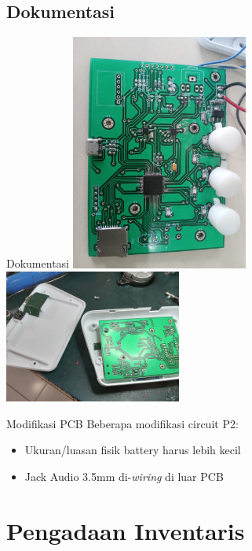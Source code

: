 \documentclass[table,dvipsnames]{beamer}
\begin{document}
	\begin{frame}
		\subsection{Dokumentasi}
		\begin{exampleblock}{Dokumentasi}
			\includegraphics[width=165pt]{images/pack_open0}
			\includegraphics[width=165pt]{images/pack_open1}
		\end{exampleblock}
	
		\begin{exampleblock}{Modifikasi PCB}
			Beberapa modifikasi circuit P2:
			\begin{itemize}
				\item Ukuran/luasan fisik battery harus lebih kecil
				\item Jack Audio 3.5mm di-\textit{wiring} di luar PCB
			\end{itemize}
		\end{exampleblock}
	\end{frame}
	
	\section{Pengadaan Inventaris}
	
\end{document}
